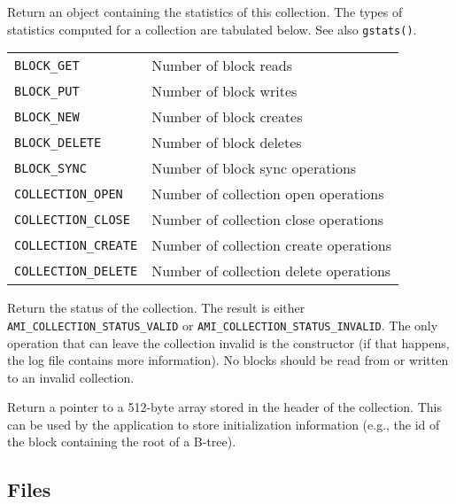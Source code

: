         {Return an object containing the statistics of this collection. The
        types of statistics computed for a collection are tabulated
        below. See also \lstinline|gstats()|.\\[1mm] \begin{tabular}{|l|l|} \hline \lstinline|BLOCK_GET| & Number
        of block reads\\ \lstinline|BLOCK_PUT| & Number of block writes \\
        \lstinline|BLOCK_NEW| & Number of block creates\\
        \lstinline|BLOCK_DELETE| & Number of block deletes\\
        \lstinline|BLOCK_SYNC| & Number of block sync operations\\
        \lstinline|COLLECTION_OPEN| & Number of collection open operations\\
        \lstinline|COLLECTION_CLOSE| & Number of collection close
        operations\\ \lstinline|COLLECTION_CREATE| & Number of collection
        create operations\\ \lstinline|COLLECTION_DELETE| & Number of
        collection delete operations\\ \hline \end{tabular} }

         {Return
        the status of the collection. The result is either
        \lstinline|AMI_COLLECTION_STATUS_VALID| or
        \lstinline|AMI_COLLECTION_STATUS_INVALID|. The only operation that
        can leave the collection invalid is the constructor (if that
        happens, the log file contains more information). No blocks should
        be read from or written to an invalid collection.}

         {Return a pointer to a 512-byte array
        stored in the header of the collection. This can be used by the
        application to store initialization information (e.g., the id of
        the block containing the root of a B-tree).}

   \etabb
{}

\clearpage

\subsection{Files}
\btabb
    {}
\etabb

